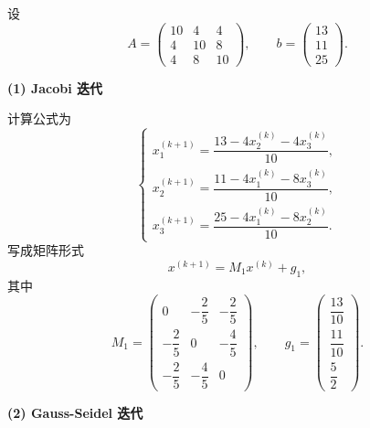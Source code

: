 \documentclass[11pt, a4paper]{ctexart}
\begin{document}
\begin{solution}
    设
    \[
        A =
        \begin{pmatrix}
            10 & 4 & 4 \\
            4 & 10 & 8 \\
            4 & 8 & 10
        \end{pmatrix},
        \qquad
        b =
        \begin{pmatrix}
            13 \\
            11 \\
            25
        \end{pmatrix}.
    \]

    \textbf{(1) Jacobi 迭代}

    计算公式为
    \[
        \begin{cases}
            x_1^{(k+1)} = \dfrac{13 - 4x_2^{(k)} - 4x_3^{(k)}}{10}, \\
            x_2^{(k+1)} = \dfrac{11 - 4x_1^{(k)} - 8x_3^{(k)}}{10}, \\
            x_3^{(k+1)} = \dfrac{25 - 4x_1^{(k)} - 8x_2^{(k)}}{10}.
        \end{cases}
    \]
    写成矩阵形式
    \[
        x^{(k+1)} = M_1 x^{(k)} + g_1,
    \]
    其中
    \[
        M_1
        =
        \begin{pmatrix}
            0 & -\dfrac{2}{5} & -\dfrac{2}{5} \\
            -\dfrac{2}{5} & 0 & -\dfrac{4}{5} \\
            -\dfrac{2}{5} & -\dfrac{4}{5} & 0
        \end{pmatrix},
        \qquad
        g_1
        =
        \begin{pmatrix}
            \dfrac{13}{10} \\
            \dfrac{11}{10} \\
            \dfrac{5}{2}
        \end{pmatrix}.
    \]

    \textbf{(2) Gauss-Seidel 迭代}


\end{solution}
\end{document}
